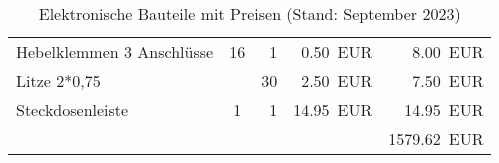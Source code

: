 \documentclass[./00PhotoBox.tex]{subfiles}
\begin{document}
\begin{table}[ht]
\begin{tabular}{l|c|r|r|r}
        Hebelklemmen 3 Anschlüsse & 16     & 1              & \SI{0,50}{EUR}       & \SI{8,00}{EUR}    \\
        Litze 2*0,75              &        & 30             & \SI{2,50}{EUR}       & \SI{7,50}{EUR}    \\
        Steckdosenleiste          & 1      & 1              & \SI{14,95}{EUR}      & \SI{14,95}{EUR}   \\
                                  &        &                &                      & \SI{1579,62}{EUR} \\
    \end{tabular}
    \caption{Elektronische Bauteile mit Preisen (Stand: September 2023)}
    \label{tab:bauteile_elektronisch}
\end{table}
\end{document}
